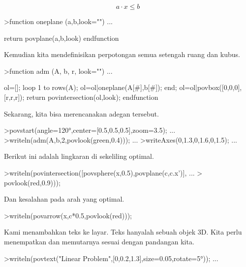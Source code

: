 \documentclass[12pt,Times new roman,letterpaper]{book}
\begin{document}
\begin{eulernootebook}
\begin{eulercomment}
\begin{eulercomment}
\begin{eulernootebook}
\begin{eulercomment}
\begin{eulercomment}
\begin{eulercomment}
\begin{eulercomment}
\begin{eulercomment}
\begin{eulercomment}
\begin{eulercomment}
\begin{eulernotebook}
\begin{eulercomment}
\end{eulercomment}
\begin{eulerformula}
\[
a \cdot x \le b
\]
\end{eulerformula}
\begin{eulerprompt}
>function oneplane (a,b,look="") ...
\end{eulerprompt}
\begin{eulerudf}
    return povplane(a,b,look)
  endfunction
\end{eulerudf}
\begin{eulercomment}
Kemudian kita mendefinisikan perpotongan semua setengah ruang dan
kubus.
\end{eulercomment}
\begin{eulerprompt}
>function adm (A, b, r, look="") ...
\end{eulerprompt}
\begin{eulerudf}
    ol=[];
    loop 1 to rows(A); ol=ol|oneplane(A[#],b[#]); end;
    ol=ol|povbox([0,0,0],[r,r,r]);
    return povintersection(ol,look);
  endfunction
\end{eulerudf}
\begin{eulercomment}
Sekarang, kita bisa merencanakan adegan tersebut.
\end{eulercomment}
\begin{eulerprompt}
>povstart(angle=120°,center=[0.5,0.5,0.5],zoom=3.5); ...
>writeln(adm(A,b,2,povlook(green,0.4))); ...
>writeAxes(0,1.3,0,1.6,0,1.5); ...
\end{eulerprompt}
\begin{eulercomment}
Berikut ini adalah lingkaran di sekeliling optimal.
\end{eulercomment}
\begin{eulerprompt}
>writeln(povintersection([povsphere(x,0.5),povplane(c,c.x')], ...
>  povlook(red,0.9)));
\end{eulerprompt}
\begin{eulercomment}
Dan kesalahan pada arah yang optimal.
\end{eulercomment}
\begin{eulerprompt}
>writeln(povarrow(x,c*0.5,povlook(red)));
\end{eulerprompt}
\begin{eulercomment}
Kami menambahkan teks ke layar. Teks hanyalah sebuah objek 3D. Kita
perlu menempatkan dan memutarnya sesuai dengan pandangan kita.
\end{eulercomment}
\begin{eulerprompt}
>writeln(povtext("Linear Problem",[0,0.2,1.3],size=0.05,rotate=5°)); ...

\end{eulerprompt}
\end{eulernotebook}
\end{eulercomment}
\end{eulercomment}
\end{eulercomment}
\end{eulercomment}
\end{eulercomment}
\end{eulercomment}
\end{eulercomment}
\end{eulernootebook}
\end{eulercomment}
\end{eulercomment}
\end{eulernootebook}
\end{document}
